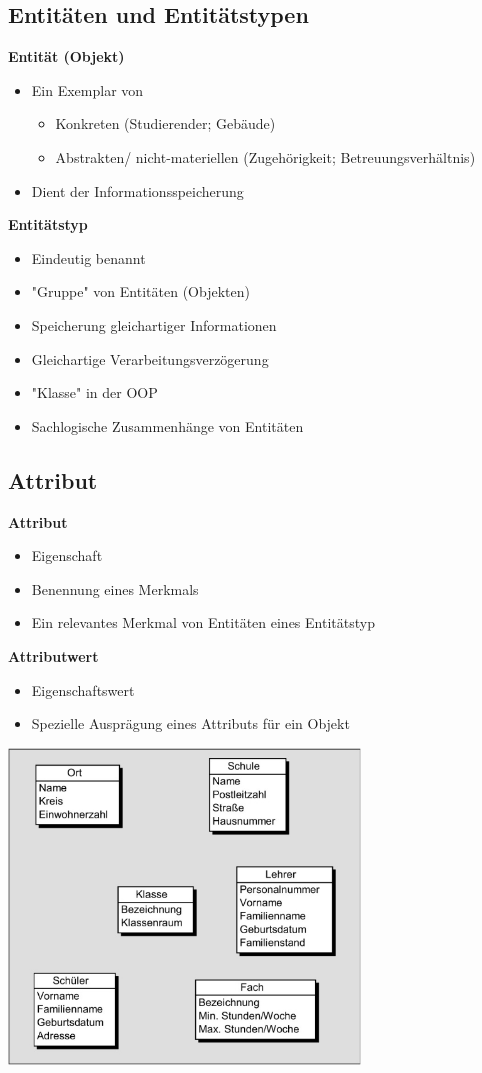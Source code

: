 \documentclass{scrreprt}
\begin{document}
\subsection{Entitäten und Entitätstypen}
\textbf{Entität (Objekt)}
\begin{itemize}
  \item Ein Exemplar von
  \begin{itemize}
    \item Konkreten (Studierender; Gebäude)
    \item Abstrakten/ nicht-materiellen (Zugehörigkeit; Betreuungsverhältnis)
  \end{itemize}
  \item Dient der Informationsspeicherung
\end{itemize}
\textbf{Entitätstyp}
\begin{itemize}
  \item Eindeutig benannt
  \item "Gruppe" von Entitäten (Objekten)
  \item Speicherung gleichartiger Informationen
  \item Gleichartige Verarbeitungsverzögerung
  \item "Klasse" in der OOP
  \item Sachlogische Zusammenhänge von Entitäten 
\end{itemize}
\subsection{Attribut}
\textbf{Attribut}
\begin{itemize}
  \item Eigenschaft
  \item Benennung eines Merkmals
  \item Ein relevantes Merkmal von Entitäten eines Entitätstyp
\end{itemize}
\textbf{Attributwert}
\begin{itemize}
  \item Eigenschaftswert
  \item Spezielle Ausprägung eines Attributs für ein Objekt
\end{itemize}
\includegraphics[width=0.7\textwidth]{"graphics/BSP-entity"}
\end{document}
